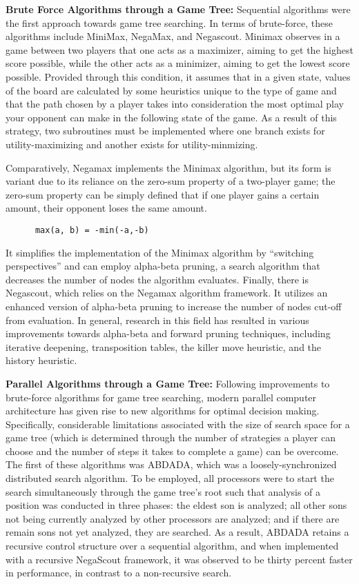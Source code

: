 \documentclass[conference]{IEEEtran}
\begin{document}
\noindent \textbf{Brute Force Algorithms through a Game Tree: } Sequential algorithms were the first approach towards game tree searching. In terms of brute-force, these algorithms include MiniMax, NegaMax, and Negascout. Minimax observes in a game between two players that one acts as a maximizer, aiming to get the highest score possible, while the other acts as a minimizer, aiming to get the lowest score possible. Provided through this condition, it assumes that in a given state, values of the board are calculated by some heuristics unique to the type of game and that the path chosen by a player takes into consideration the most optimal play your opponent can make in the following state of the game. As a result of this strategy, two subroutines must be implemented where one branch exists for utility-maximizing and another exists for utility-minmizing.

Comparatively, Negamax implements the Minimax algorithm, but its form is variant due to its reliance on the zero-sum property of a two-player game; the zero-sum property can be simply defined that if one player gains a certain amount, their opponent loses the same amount.

\begin{lstlisting}
	  max(a, b) = -min(-a,-b)
\end{lstlisting}

\noindent It simplifies the implementation of the Minimax algorithm by ``switching perspectives'' and can employ alpha-beta pruning, a search algorithm that decreases the number of nodes the algorithm evaluates. Finally, there is Negascout, which relies on the Negamax algorithm framework. It utilizes an enhanced version of alpha-beta pruning to increase the number of nodes cut-off from evaluation. In general, research in this field has resulted in various improvements towards alpha-beta and forward pruning techniques, including iterative deepening, transposition tables, the killer move heuristic, and the history heuristic.
\medskip

\noindent \textbf{Parallel Algorithms through a Game Tree: } Following improvements to brute-force algorithms for game tree searching, modern parallel computer architecture has given rise to new algorithms for optimal decision making. Specifically, considerable limitations associated with the size of search space for a game tree (which is determined through the number of strategies a player can choose and the number of steps it takes to complete a game) can be overcome. The first of these algorithms was ABDADA, which was a loosely-synchronized distributed search algorithm. To be employed, all processors were to start the search simultaneously through the game tree's root such that analysis of a position was conducted in three phases: the eldest son is analyzed; all other sons not being currently analyzed by other processors are analyzed; and if there are remain sons not yet analyzed, they are searched. As a result, ABDADA retains a recursive control structure over a sequential algorithm, and when implemented with a recursive NegaScout framework, it was observed to be thirty percent faster in performance, in contrast to a non-recursive search.
\end{document}

